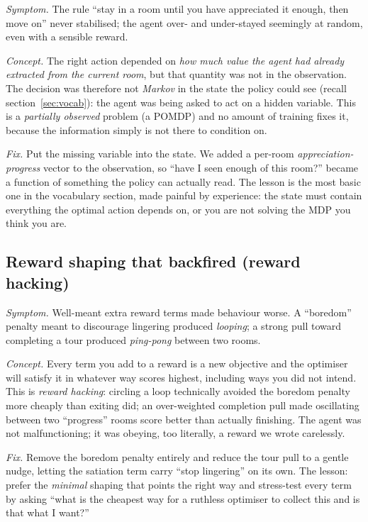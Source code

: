 \documentclass[11pt]{article}
\newcommand{\key}[1]{\textit{#1}}            %
\begin{document}
\emph{Symptom.} The rule ``stay in a room until you have appreciated it enough, then move
on'' never stabilised; the agent over- and under-stayed seemingly at random, even with a
sensible reward.

\emph{Concept.} The right action depended on \emph{how much value the agent had already
extracted from the current room}, but that quantity was not in the observation. The decision
was therefore not \key{Markov} in the state the policy could see (recall section~\ref{sec:vocab}): the
agent was being asked to act on a hidden variable. This is a \key{partially observed} problem
(a POMDP) and no amount of training fixes it, because the information simply is not there to
condition on.

\emph{Fix.} Put the missing variable into the state. We added a per-room
\key{appreciation-progress} vector to the observation, so ``have I seen enough of this room?''
became a function of something the policy can actually read. The lesson is the most basic one
in the vocabulary section, made painful by experience: the state must contain everything the
optimal action depends on, or you are not solving the MDP you think you are.

\subsection{Reward shaping that backfired (reward hacking)}

\emph{Symptom.} Well-meant extra reward terms made behaviour worse. A ``boredom'' penalty
meant to discourage lingering produced \emph{looping}; a strong pull toward completing a tour
produced \emph{ping-pong} between two rooms.

\emph{Concept.} Every term you add to a reward is a new objective and the optimiser will
satisfy it in whatever way scores highest, including ways you did not intend. This is
\key{reward hacking}: circling a loop technically avoided the boredom penalty more cheaply
than exiting did; an over-weighted completion pull made oscillating between two ``progress''
rooms score better than actually finishing. The agent was not malfunctioning; it was
obeying, too literally, a reward we wrote carelessly.

\emph{Fix.} Remove the boredom penalty entirely and reduce the tour pull to a gentle nudge,
letting the satiation term carry ``stop lingering'' on its own. The lesson: prefer the
\emph{minimal} shaping that points the right way and stress-test every term by asking
``what is the cheapest way for a ruthless optimiser to collect this and is that what I
want?''
\end{document}
